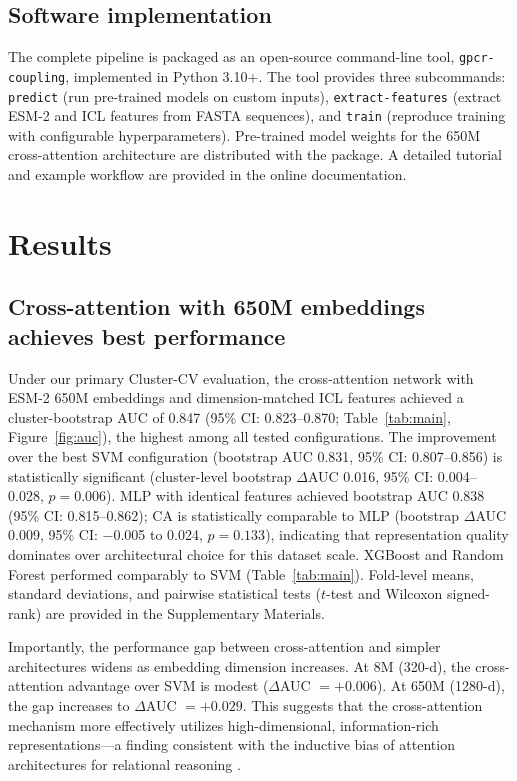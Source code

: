 \documentclass[11pt,a4paper]{article}
\begin{document}
\subsection{Software implementation}

The complete pipeline is packaged as an open-source command-line tool, \texttt{gpcr-coupling}, implemented in Python 3.10+. The tool provides three subcommands: \texttt{predict} (run pre-trained models on custom inputs), \texttt{extract-features} (extract ESM-2 and ICL features from FASTA sequences), and \texttt{train} (reproduce training with configurable hyperparameters). Pre-trained model weights for the 650M cross-attention architecture are distributed with the package. A detailed tutorial and example workflow are provided in the online documentation.

\section{Results}

\subsection{Cross-attention with 650M embeddings achieves best performance}

Under our primary Cluster-CV evaluation, the cross-attention network with ESM-2 650M embeddings and dimension-matched ICL features achieved a cluster-bootstrap AUC of 0.847 (95\% CI: 0.823--0.870; Table~\ref{tab:main}, Figure~\ref{fig:auc}), the highest among all tested configurations. The improvement over the best SVM configuration (bootstrap AUC 0.831, 95\% CI: 0.807--0.856) is statistically significant (cluster-level bootstrap $\Delta$AUC 0.016, 95\% CI: 0.004--0.028, $p = 0.006$). MLP with identical features achieved bootstrap AUC 0.838 (95\% CI: 0.815--0.862); CA is statistically comparable to MLP (bootstrap $\Delta$AUC 0.009, 95\% CI: $-$0.005 to 0.024, $p = 0.133$), indicating that representation quality dominates over architectural choice for this dataset scale. XGBoost and Random Forest performed comparably to SVM (Table~\ref{tab:main}). Fold-level means, standard deviations, and pairwise statistical tests ($t$-test and Wilcoxon signed-rank) are provided in the Supplementary Materials.

Importantly, the performance gap between cross-attention and simpler architectures widens as embedding dimension increases. At 8M (320-d), the cross-attention advantage over SVM is modest ($\Delta$AUC $= +0.006$). At 650M (1280-d), the gap increases to $\Delta$AUC $= +0.029$. This suggests that the cross-attention mechanism more effectively utilizes high-dimensional, information-rich representations---a finding consistent with the inductive bias of attention architectures for relational reasoning \cite{vaswani2017attention}.
\end{document}
